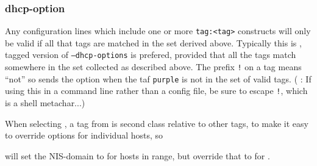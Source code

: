 {  \subsubsection{dhcp-option}


  
  Any configuration lines which include one or more \texttt{tag:<tag>}
  constructs will only be valid if all that tags are matched in the set derived
  above. Typically this is , tagged version of
  \texttt{--dhcp-options} is prefered, provided that all the tags match
  somewhere in the set collected as described above. The prefix \texttt{!} on a
  tag means ``not'' so  sends the
  option when the taf \texttt{purple} is not in the set of valid tags.
  ( : If using
  this in a command line rather than a config file, be sure to escape
  \texttt{!}, which is a shell metachar...)

  When selecting , a tag from  is
  second class relative to other tags, to make it easy to override options for
  individual hosts, so

  will set the NIS-domain to  for hosts in range, but override
  that to  for .

}